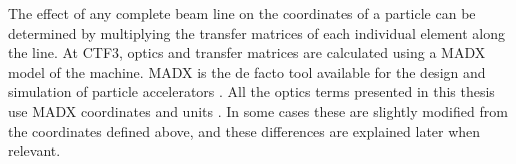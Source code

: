 
The effect of any complete beam line on the coordinates of a particle can be determined by multiplying the transfer matrices of each individual element along the line. At CTF3, optics and transfer matrices are calculated using a MADX model of the machine. MADX is the de facto tool available for the design and simulation of particle accelerators \cite{madx}. All the optics terms presented in this thesis use MADX coordinates and units \cite{madx}. In some cases these are slightly modified from the coordinates defined above, and these differences are explained later when relevant.

